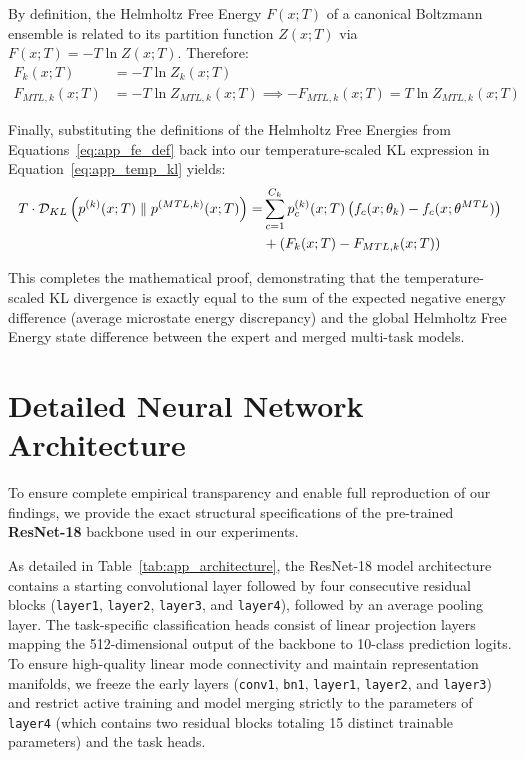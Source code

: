 \documentclass{article}
\theoremstyle{plain}
\theoremstyle{definition}
\theoremstyle{remark}
\begin{document}
By definition, the Helmholtz Free Energy $F(x; T)$ of a canonical Boltzmann ensemble is related to its partition function $Z(x; T)$ via $F(x; T) = -T \ln Z(x; T)$. Therefore:
\begin{align}
\label{eq:app_fe_def}
F_k(x; T) &= -T \ln Z_k(x; T) \\
F_{MTL, k}(x; T) &= -T \ln Z_{MTL, k}(x; T) \implies - F_{MTL, k}(x; T) = T \ln Z_{MTL, k}(x; T)
\end{align}

Finally, substituting the definitions of the Helmholtz Free Energies from Equations~\eqref{eq:app_fe_def} back into our temperature-scaled KL expression in Equation~\eqref{eq:app_temp_kl} yields:
\begin{align}
\label{eq:app_final_deriv}
T \cdot \mathcal{D}_{KL} \left( p^{(k)}(x; T) \parallel p^{(MTL, k)}(x; T) \right) = &\sum_{c=1}^{C_k} p_c^{(k)}(x; T) \left( f_c(x; \theta_k) - f_c(x; \theta^{MTL}) \right) \notag \\
&+ \left( F_k(x; T) - F_{MTL, k}(x; T) \right)
\end{align}

This completes the mathematical proof, demonstrating that the temperature-scaled KL divergence is exactly equal to the sum of the expected negative energy difference (average microstate energy discrepancy) and the global Helmholtz Free Energy state difference between the expert and merged multi-task models.

\section{Detailed Neural Network Architecture}
\label{sec:architecture}

To ensure complete empirical transparency and enable full reproduction of our findings, we provide the exact structural specifications of the pre-trained \textbf{ResNet-18} backbone used in our experiments. 

As detailed in Table~\ref{tab:app_architecture}, the ResNet-18 model architecture contains a starting convolutional layer followed by four consecutive residual blocks (\texttt{layer1}, \texttt{layer2}, \texttt{layer3}, and \texttt{layer4}), followed by an average pooling layer. The task-specific classification heads consist of linear projection layers mapping the 512-dimensional output of the backbone to 10-class prediction logits. To ensure high-quality linear mode connectivity and maintain representation manifolds, we freeze the early layers (\texttt{conv1}, \texttt{bn1}, \texttt{layer1}, \texttt{layer2}, and \texttt{layer3}) and restrict active training and model merging strictly to the parameters of \texttt{layer4} (which contains two residual blocks totaling 15 distinct trainable parameters) and the task heads.
\end{document}
